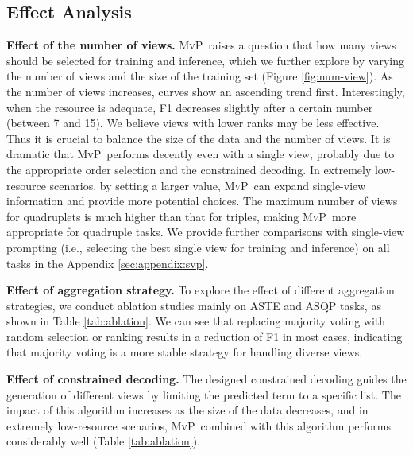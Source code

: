 \documentclass[11pt]{article}
\newcommand\mvp{\textsc{MvP}}
\begin{document}
\subsection{Effect Analysis}
\label{sec:results:ablation}




\textbf{Effect of the number of views.}
\mvp~raises a question that how many views should be selected for training and inference, which we further explore by varying the number of views and the size of the training set  (Figure \ref{fig:num-view}). 
As the number of views increases, curves show an ascending trend first. Interestingly, when the resource is adequate, F1 decreases slightly after a certain number (between 7 and 15). We believe views with lower ranks may be less effective. Thus it is crucial to balance the size of the data and the number of views. 
It is dramatic that \mvp~performs decently even with a single view, probably due to the appropriate order selection and the constrained decoding. In extremely low-resource scenarios, 
by setting a larger value, \mvp~can expand single-view information and provide more potential choices. The maximum number of views for quadruplets is much higher than that for triples, making \mvp~more appropriate for quadruple tasks.
We provide further comparisons with single-view prompting (i.e., selecting the best single view for training and inference) on all tasks in the Appendix \ref{sec:appendix:svp}.


\textbf{Effect of aggregation strategy.} 
To explore the effect of different aggregation strategies, 
we conduct ablation studies mainly on ASTE and ASQP tasks, as shown in Table \ref{tab:ablation}.
We can see that replacing majority voting with random selection or ranking results in a reduction of F1 in most cases, indicating that majority voting is a more stable strategy for handling diverse views.




\textbf{Effect of constrained decoding.}
The designed constrained decoding guides the generation of different views
by limiting the predicted term to a specific list.
The impact of this algorithm increases as the size of the data decreases, and in extremely low-resource scenarios, \mvp~combined with this algorithm performs considerably well (Table \ref{tab:ablation}).
\end{document}
